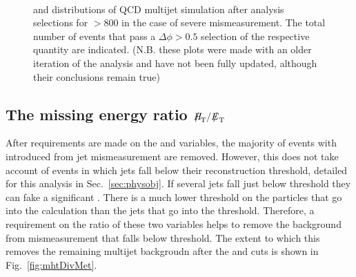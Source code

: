 \begin{figure}[!h]
 \centering
  \\
 \caption{\bdphi and \dphimhtj distributions of QCD multijet simulation
 after analysis selections for \scalht $> 800$ \GeV in the case of
 severe mismeasurement. The
 total number of events that pass a $\Delta\phi > 0.5$ selection of the
 respective quantity are indicated. (N.B. these plots were made with
 an older iteration of the analysis and have not been fully updated,
 although their conclusions remain true)}
 \label{fig:bDPhi_mismeasured}
\end{figure}

\subsection{The missing energy ratio $\MHT/\MET$}

After requirements are made on the \alphat and \bdphi variables, the
majority of events with \MHT introduced from jet mismeasurement are
removed. However, this does not take account of events in which jets
fall below their reconstruction threshold, detailed for this analysis
in Sec.~\ref{sec:physobj}. If several jets fall just below threshold
they can fake a significant \MHT. There is a much lower threshold
on the particles that go into the \MET calculation than the jets that
go into the \MHT threshold. Therefore, a requirement on the ratio of
these two variables helps to remove the background from mismeasurement
that falls below threshold. The extent to which this removes the
remaining \QCD multijet backgroudn after the \alphat and \bdphi cuts
is shown in Fig.~\ref{fig:mhtDivMet}.

